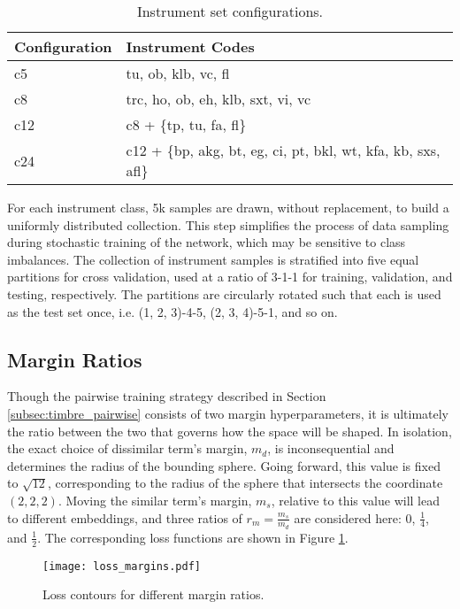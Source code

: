 \begin{table*}[t]
\begin{center}
\caption{Instrument set configurations.}
\begin{tabular}{l | l }
Configuration & Instrument Codes \\
\hline
c5 & tu, ob, klb, vc, fl \\
c8 & trc, ho, ob, eh, klb, sxt, vi, vc \\
c12 & c8 + \{tp, tu, fa, fl\} \\
c24 & c12 + \{bp, akg, bt, eg, ci, pt, bkl, wt, kfa, kb, sxs, afl\} \\
\hline
\end{tabular}
\label{tab:palette}
\end{center}
\end{table*}

For each instrument class, 5k samples are drawn, without replacement, to build a uniformly distributed collection.
This step simplifies the process of data sampling during stochastic training of the network, which may be sensitive to class imbalances.
The collection of instrument samples is stratified into five equal partitions for cross validation, used at a ratio of 3-1-1 for training, validation, and testing, respectively.
The partitions are circularly rotated such that each is used as the test set once, i.e. (1, 2, 3)-4-5, (2, 3, 4)-5-1, and so on.


\subsection{Margin Ratios}

Though the pairwise training strategy described in Section \ref{subsec:timbre_pairwise} consists of two margin hyperparameters, it is ultimately the ratio between the two that governs how the space will be shaped.
In isolation, the exact choice of dissimilar term's margin, $m_{d}$, is inconsequential and determines the radius of the bounding sphere.
Going forward, this value is fixed to $\sqrt{12}$, corresponding to the radius of the sphere that intersects the coordinate $(2, 2, 2)$.
Moving the similar term's margin, $m_{s}$, relative to this value will lead to different embeddings, and three ratios of $r_{m} = \frac{m_{s}}{m_{d}}$ are considered here: 0, $\frac{1}{4}$, and $\frac{1}{2}$.
The corresponding loss functions are shown in Figure \ref{fig:margins}.

\begin{figure}[h]
\centering
\texttt{[image: loss\_margins.pdf]}
\caption{Loss contours for different margin ratios.}
\label{fig:margins}
\end{figure}


